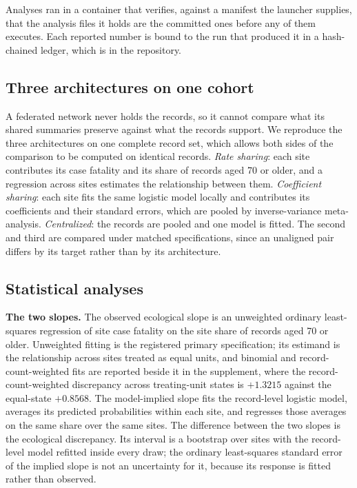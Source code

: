 \documentclass[11pt]{article}
\begin{document}
Analyses ran in a container that verifies, against a manifest the
launcher supplies, that the analysis files it holds are the committed
ones before any of them executes.  Each reported number is bound to the
run that produced it in a hash-chained ledger, which is in the
repository.

\subsection{Three architectures on one cohort}

A federated network never holds the records, so it cannot compare what
its shared summaries preserve against what the records support.  We
reproduce the three architectures on one complete record set, which
allows both sides of the comparison to be computed on identical
records.  \emph{Rate sharing}: each site contributes its case
fatality and its share of records aged 70 or older, and a regression
across sites estimates the relationship between them.  \emph{Coefficient
sharing}: each site fits the same logistic model locally and contributes
its coefficients and their standard errors, which are pooled by
inverse-variance meta-analysis.  \emph{Centralized}: the records are
pooled and one model is fitted.  The second and third are compared under
matched specifications, since an unaligned pair differs by its target
rather than by its architecture.

\subsection{Statistical analyses}

\textbf{The two slopes.}  The observed ecological slope is an unweighted
ordinary least-squares regression of site case fatality on the site
share of records aged 70 or older.  Unweighted fitting is the
registered primary specification; its estimand is the relationship
across sites treated as equal units, and binomial and
record-count-weighted fits are reported beside it in the supplement,
where the record-count-weighted discrepancy across treating-unit states
is $+1.3215$ against the equal-state $+0.8568$.  The model-implied slope fits the record-level logistic
model, averages its predicted probabilities within each site, and
regresses those averages on the same share over the same sites.  The
difference between the two slopes is the ecological discrepancy.  Its
interval is a bootstrap over sites with the record-level model refitted
inside every draw; the ordinary least-squares standard error of the
implied slope is not an uncertainty for it, because its response is
fitted rather than observed.
\end{document}
